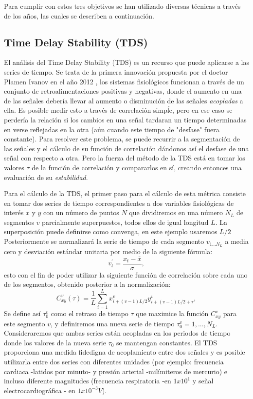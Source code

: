 \documentclass[twoside,twocolumn]{article}
\begin{document}
Para cumplir con estos tres objetivos se han utilizado diversas técnicas a través de los años, las cuales se describen a continuación.

\subsection{Time Delay Stability (TDS)}
El análisis del Time Delay Stability (TDS) es un recurso que puede aplicarse a las series de tiempo.
Se trata de la primera innovación propuesta por el doctor Plamen Ivanov en el año 2012 \cite{bashan2012network}, los sistemas fisiológicos funcionan a través de un conjunto de retroalimentaciones positivas y negativas, donde el aumento en una de las señales debería llevar al aumento o disminución de las señales \textit{acopladas} a ella. Es posible medir esto a través de correlación simpĺe, pero en ese caso se perdería la relación si los cambios en una señal tardaran un tiempo determinadas en verse reflejadas en la otra (aún cuando este tiempo de "desfase" fuera constante).
Para resolver este problema, se puede recurrir a la segmentación de las señales y el cálculo de su función de correlación dándonos así el desfase de una señal con respecto a otra. Pero la fuerza del método de la TDS está en tomar los valores $\tau$ de la función de correlación y compararlos en sí, creando entonces una evaluación de su \textit{estabilidad}.

Para el cálculo de la TDS, el primer paso para el cálculo de esta métrica consiste en tomar dos series de tiempo correspondientes a dos variables fisiológicas de interés $x$ y $y$ con un número de puntos $N$ que dividiremos en una número $N_L$ de segmentos $v$ parcialmente superpuestos, todos ellos de igual longitud $L$.
La superposición puede definirse como convenga, en este ejemplo usaremos $L/2$
Posteriormente se normalizará la serie de tiempo de cada segmento $v_{1...N_L}$ a media cero y desviación estándar unitaria por medio de la siguiente fórmula:
\begin{equation}
  v^\prime_t = \frac{x_t-\bar{x}}{\sigma} ,
\end{equation}
esto con el fin de poder utilizar la siguiente función de correlación sobre cada uno de los segmentos, obtenido posterior a la normalización:
\begin{equation}
  C^v_{xy}(\tau)=\frac{1}{L}\sum^L_{i=1}x^v_{i+(v-1)L/2}y^v_{i+(v-1)L/2+\tau} ,
\end{equation}
Se define así $\tau^v_0$ como el retraso de tiempo $\tau$ que maximice la función $C^v_{xy}$ para este segmento $v$, y definiremos una nueva serie de tiempo ${\tau^v_0}=1,...,N_L$.
Consideraremos que ambas series están acopladas en los periodos de tiempo donde los valores de la nueva serie $\tau_0$ se mantengan constantes.
El TDS proporciona una medida fidedigna de acoplamiento entre dos señales y es posible utilizarla entre dos series con diferentes unidades (por ejemplo: frecuencia cardiaca -latidos por minuto- y presión arterial -milímiteros de mercurio) e incluso diferente magnitudes (frecuencia respiratoria -en $1x10^1$ y señal electrocardiográfica - en $1x10^{-3}V$).
\end{document}
